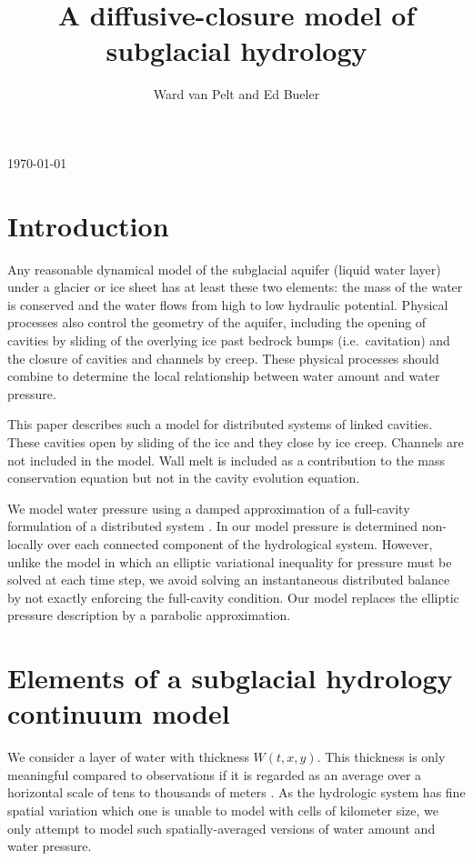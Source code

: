 \documentclass[11pt,final]{amsart}%
\title[]{A diffusive-closure model of subglacial hydrology}
\author[]{Ward van Pelt and Ed Bueler}
\begin{document}
\graphicspath{{../figs/}}

\scriptsize \hfill \today \normalsize
\vspace{0.5in}

\maketitle
\thispagestyle{empty}

\section{Introduction}

Any reasonable dynamical model of the subglacial aquifer (liquid water layer) under a glacier or ice sheet has at least these two elements: the mass of the water is conserved and the water flows from high to low hydraulic potential.  Physical processes also control the geometry of the aquifer, including the opening of cavities by sliding of the overlying ice past bedrock bumps (i.e.~cavitation) and the closure of cavities and channels by creep.  These physical processes should combine to determine the local relationship between water amount and water pressure.  

This paper describes such a model for distributed systems of linked cavities.  These cavities open by sliding of the ice and they close by ice creep.  Channels are not included in the model.  Wall melt is included as a contribution to the mass conservation equation but not in the cavity evolution equation.

We model water pressure using a damped approximation of a full-cavity formulation of a distributed system \cite{Schoofetal2012}.  In our model pressure is determined non-locally over each connected component of the hydrological system.  However, unlike the \cite{Schoofetal2012} model in which an elliptic variational inequality for pressure must be solved at each time step, we avoid solving an instantaneous distributed balance by not exactly enforcing the full-cavity condition.  Our model replaces the elliptic pressure description by a parabolic approximation.


\section{Elements of a subglacial hydrology continuum model}

We consider a layer of water with thickness $W(t,x,y)$.  This thickness is only meaningful compared to observations if it is regarded as an average over a horizontal scale of tens to thousands of meters \citep{FlowersClarke2002_theory}.  As the hydrologic system has fine spatial variation which one is unable to model with cells of kilometer size, we only attempt to model such spatially-averaged versions of water amount and water pressure.
\end{document}
